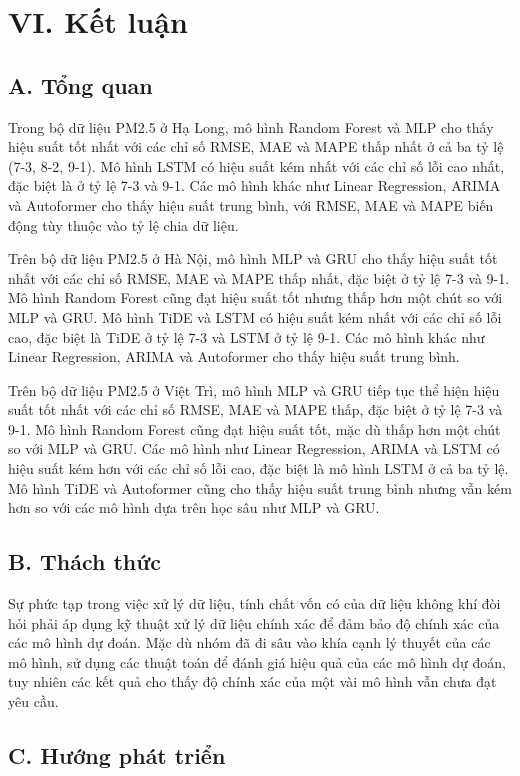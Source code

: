 \section*{VI. Kết luận}
\subsection*{A. Tổng quan}
Trong bộ dữ liệu PM2.5 ở Hạ Long, mô hình Random Forest và MLP cho thấy hiệu suất tốt nhất với các chỉ số RMSE, MAE và MAPE thấp nhất ở cả ba tỷ lệ (7-3, 8-2, 9-1). Mô hình LSTM có hiệu suất kém nhất với các chỉ số lỗi cao nhất, đặc biệt là ở tỷ lệ 7-3 và 9-1. Các mô hình khác như Linear Regression, ARIMA và Autoformer cho thấy hiệu suất trung bình, với RMSE, MAE và MAPE biến động tùy thuộc vào tỷ lệ chia dữ liệu.

Trên bộ dữ liệu PM2.5 ở Hà Nội, mô hình MLP và GRU cho thấy hiệu suất tốt nhất với các chỉ số RMSE, MAE và MAPE thấp nhất, đặc biệt ở tỷ lệ 7-3 và 9-1. Mô hình Random Forest cũng đạt hiệu suất tốt nhưng thấp hơn một chút so với MLP và GRU. Mô hình TiDE và LSTM có hiệu suất kém nhất với các chỉ số lỗi cao, đặc biệt là TiDE ở tỷ lệ 7-3 và LSTM ở tỷ lệ 9-1. Các mô hình khác như Linear Regression, ARIMA và Autoformer cho thấy hiệu suất trung bình.

Trên bộ dữ liệu PM2.5 ở Việt Trì, mô hình MLP và GRU tiếp tục thể hiện hiệu suất tốt nhất với các chỉ số RMSE, MAE và MAPE thấp, đặc biệt ở tỷ lệ 7-3 và 9-1. Mô hình Random Forest cũng đạt hiệu suất tốt, mặc dù thấp hơn một chút so với MLP và GRU. Các mô hình như Linear Regression, ARIMA và LSTM có hiệu suất kém hơn với các chỉ số lỗi cao, đặc biệt là mô hình LSTM ở cả ba tỷ lệ. Mô hình TiDE và Autoformer cũng cho thấy hiệu suất trung bình nhưng vẫn kém hơn so với các mô hình dựa trên học sâu như MLP và GRU.

\subsection*{B. Thách thức}

Sự phức tạp trong việc xử lý dữ liệu, tính chất vốn có của dữ liệu không khí đòi hỏi phải áp dụng kỹ thuật xử lý dữ liệu chính xác để đảm bảo độ chính xác của các mô hình dự đoán. Mặc dù nhóm đã đi sâu vào khía cạnh lý thuyết của các mô hình, sử dụng các thuật toán để đánh giá hiệu quả của các mô hình dự đoán, tuy nhiên các kết quả cho thấy độ chính xác của một vài mô hình vẫn chưa đạt yêu cầu.

\subsection*{C. Hướng phát triển}

